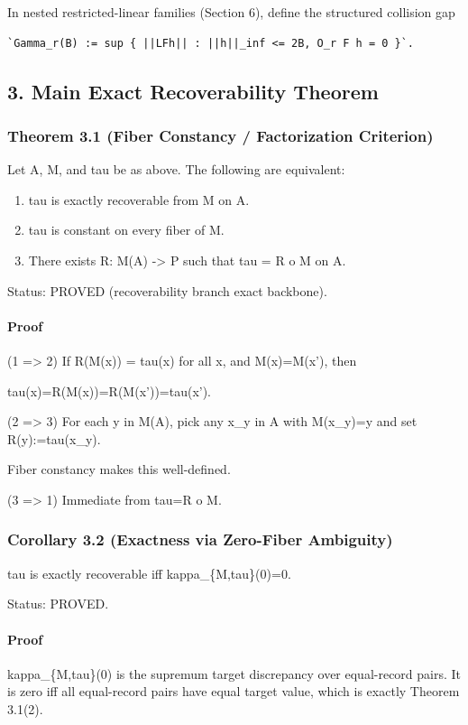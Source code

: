 \documentclass[11pt]{article}
\begin{document}
In nested restricted-linear families (Section 6), define the structured collision gap


\begin{verbatim}
`Gamma_r(B) := sup { ||LFh|| : ||h||_inf <= 2B, O_r F h = 0 }`.
\end{verbatim}

\subsection*{3. Main Exact Recoverability Theorem}

\subsubsection*{Theorem 3.1 (Fiber Constancy / Factorization Criterion)}
Let A, M, and tau be as above. The following are equivalent:

\begin{enumerate}
\item tau is exactly recoverable from M on A.
\item tau is constant on every fiber of M.
\item There exists R: M(A) -> P such that tau = R o M on A.
\end{enumerate}

Status: PROVED (recoverability branch exact backbone).


\paragraph{Proof}
(1 => 2) If R(M(x)) = tau(x) for all x, and M(x)=M(x'), then

tau(x)=R(M(x))=R(M(x'))=tau(x').


(2 => 3) For each y in M(A), pick any x\_y in A with M(x\_y)=y and set R(y):=tau(x\_y).

Fiber constancy makes this well-defined.


(3 => 1) Immediate from tau=R o M.


\subsubsection*{Corollary 3.2 (Exactness via Zero-Fiber Ambiguity)}
tau is exactly recoverable iff kappa\_\{M,tau\}(0)=0.


Status: PROVED.


\paragraph{Proof}
kappa\_\{M,tau\}(0) is the supremum target discrepancy over equal-record pairs. It is zero iff all equal-record pairs have equal target value, which is exactly Theorem 3.1(2).
\end{document}
